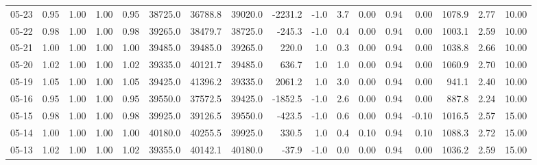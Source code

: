 \begin{threeparttable}
{\begin{tabular}{lrrrrrrrrrrrrrrrr}
  05-23 &         0.95 &           1.00 &          1.00 &          0.95 & 38725.0 & 36788.8 & 39020.0 &    -2231.2 &                     -1.0 &                 3.7 &       0.00 &      0.94 &           0.00 &           1078.9 &            2.77 &                  10.00 \\
  05-22 &         0.98 &           1.00 &          1.00 &          0.98 & 39265.0 & 38479.7 & 38725.0 &     -245.3 &                     -1.0 &                 0.4 &       0.00 &      0.94 &           0.00 &           1003.1 &            2.59 &                  10.00 \\
  05-21 &         1.00 &           1.00 &          1.00 &          1.00 & 39485.0 & 39485.0 & 39265.0 &      220.0 &                      1.0 &                 0.3 &       0.00 &      0.94 &           0.00 &           1038.8 &            2.66 &                  10.00 \\
  05-20 &         1.02 &           1.00 &          1.00 &          1.02 & 39335.0 & 40121.7 & 39485.0 &      636.7 &                      1.0 &                 1.0 &       0.00 &      0.94 &           0.00 &           1060.9 &            2.70 &                  10.00 \\
  05-19 &         1.05 &           1.00 &          1.00 &          1.05 & 39425.0 & 41396.2 & 39335.0 &     2061.2 &                      1.0 &                 3.0 &       0.00 &      0.94 &           0.00 &            941.1 &            2.40 &                  10.00 \\
  05-16 &         0.95 &           1.00 &          1.00 &          0.95 & 39550.0 & 37572.5 & 39425.0 &    -1852.5 &                     -1.0 &                 2.6 &       0.00 &      0.94 &           0.00 &            887.8 &            2.24 &                  10.00 \\
  05-15 &         0.98 &           1.00 &          1.00 &          0.98 & 39925.0 & 39126.5 & 39550.0 &     -423.5 &                     -1.0 &                 0.6 &       0.00 &      0.94 &          -0.10 &           1016.5 &            2.57 &                  15.00 \\
  05-14 &         1.00 &           1.00 &          1.00 &          1.00 & 40180.0 & 40255.5 & 39925.0 &      330.5 &                      1.0 &                 0.4 &       0.10 &      0.94 &           0.10 &           1088.3 &            2.72 &                  15.00 \\
  05-13 &         1.02 &           1.00 &          1.00 &          1.02 & 39355.0 & 40142.1 & 40180.0 &      -37.9 &                     -1.0 &                 0.0 &       0.00 &      0.94 &           0.00 &           1036.2 &            2.59 &                  15.00 \\

\end{tabular}}
\end{threeparttable}
